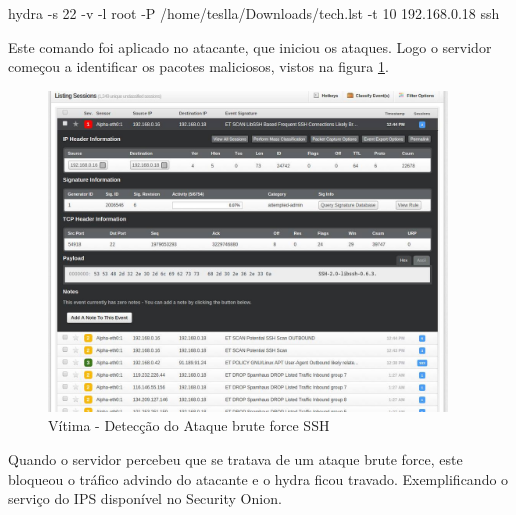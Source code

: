 	\begin{framed}
		hydra -s 22 -v -l root -P /home/teslla/Downloads/tech.lst -t 10 192.168.0.18 ssh
	\end{framed}

	Este comando foi aplicado no atacante, que iniciou os ataques. Logo o servidor
	começou a identificar os pacotes maliciosos, vistos na figura \ref{fig:ssh_vitima}.

	\begin{figure}[h]
	\centering
	\includegraphics[width=400px, scale=1]{resource/ssh_vitima}
	\caption{Vítima - Detecção do Ataque brute force SSH}
 \label{fig:ssh_vitima}
 \end{figure}

 	Quando o servidor percebeu que se tratava de um ataque brute force, este bloqueou
	o tráfico advindo do atacante e o hydra ficou travado. Exemplificando o serviço
	do IPS disponível no Security Onion.
